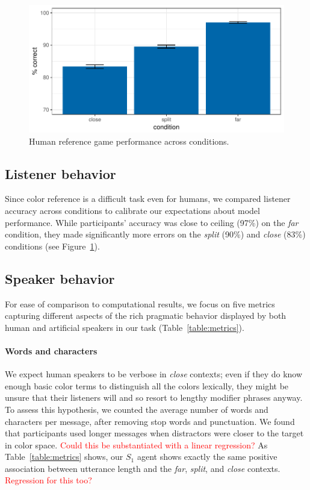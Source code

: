 \documentclass[11pt,letterpaper]{article}
\newcommand{\Speaker}{S}
\renewcommand{\|}{\mid}
\newcommand{\figref}[1]{Figure~\ref{#1}}
\newcommand{\tabref}[1]{Table~\ref{#1}}
\newcommand{\todocheck}[1]{\textcolor{red}{#1}}
\newcommand{\cond}{\emph}
\begin{document}
\begin{figure}
\includegraphics[scale = .5]{figures/listenerAccuracy}
\caption{Human reference game performance across conditions.}
\label{fig:listenerAccuracy}
\end{figure}

\subsection{Listener behavior}

Since color reference is a difficult task even for humans, we compared listener accuracy across conditions to calibrate our expectations about model performance. While participants' accuracy was close to ceiling (97\%) on the \cond{far} condition, they made significantly more errors on the \cond{split} (90\%) and \cond{close} (83\%) conditions (see \figref{fig:listenerAccuracy}).

\subsection{Speaker behavior}

For ease of comparison to computational results, we focus on five
metrics capturing different aspects of the rich pragmatic behavior
displayed by both human and artificial speakers in our task
(\tabref{table:metrics}).

\paragraph{Words and characters}
We expect human speakers to be verbose in \cond{close} contexts; even if
they do know enough basic color terms to distinguish all the colors
lexically, they might be unsure that their listeners will and so
resort to lengthy modifier phrases anyway. To assess this hypothesis,
we counted the average number of words and characters per message,
after removing stop words and punctuation. We found that participants
used longer messages when distractors were closer to the target in
color space. \todocheck{Could this be substantiated with a linear
  regression?} As \tabref{table:metrics} shows, our $\Speaker_{1}$ agent
shows exactly the same positive association between utterance length
and the \cond{far}, \cond{split}, and \cond{close} contexts. \todocheck{Regression
  for this too?}
\end{document}
